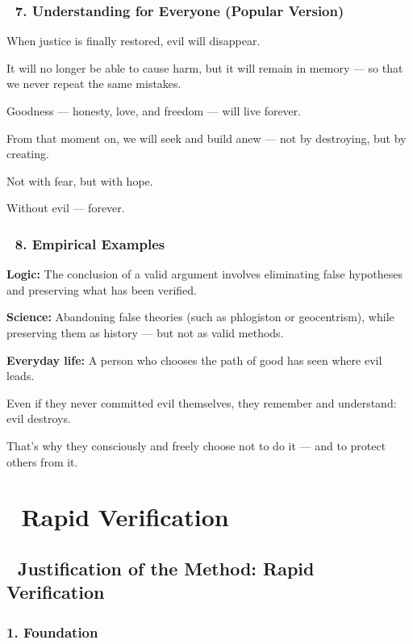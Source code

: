 \documentclass[12pt]{article}
\begin{document}
\subsubsection*{🔹 7. Understanding for Everyone (Popular Version)}

When justice is finally restored, evil will disappear.

It will no longer be able to cause harm, but it will remain in memory — so that we never repeat the same mistakes.

Goodness — honesty, love, and freedom — will live forever.

From that moment on, we will seek and build anew — not by destroying, but by creating.

Not with fear, but with hope.

Without evil — forever.

\subsubsection*{🔹 8. Empirical Examples}

\textbf{Logic:} The conclusion of a valid argument involves eliminating false hypotheses and preserving what has been verified.

\textbf{Science:} Abandoning false theories (such as phlogiston or geocentrism), while preserving them as history — but not as valid methods.

\textbf{Everyday life:} A person who chooses the path of good has seen where evil leads.

Even if they never committed evil themselves, they remember and understand: evil destroys.

That’s why they consciously and freely choose not to do it — and to protect others from it.


\section*{📘 Rapid Verification}

\subsection*{📘 Justification of the Method: Rapid Verification}

\subsubsection*{1. Foundation}
\end{document}
